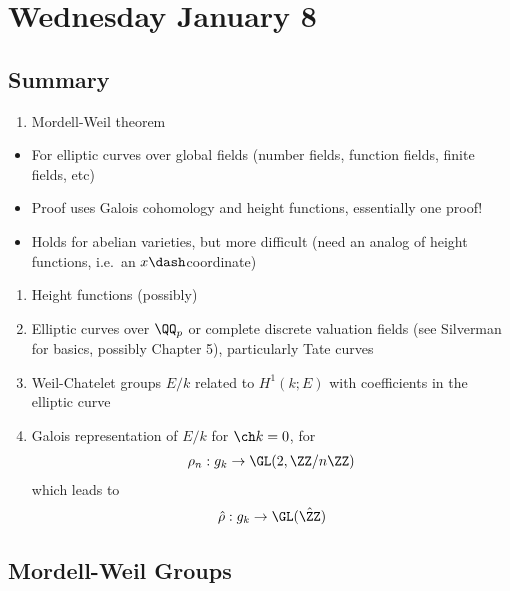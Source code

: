 \newpage
\tableofcontents

\hypertarget{wednesday-january-8}{%
\section{Wednesday January 8}\label{wednesday-january-8}}

\hypertarget{summary}{%
\subsection{Summary}\label{summary}}

\begin{enumerate}
\def\labelenumi{\arabic{enumi}.}
\tightlist
\item
  Mordell-Weil theorem
\end{enumerate}

\begin{itemize}
\item
  For elliptic curves over global fields (number fields, function
  fields, finite fields, etc)
\item
  Proof uses Galois cohomology and height functions, essentially one
  proof!
\item
  Holds for abelian varieties, but more difficult (need an analog of
  height functions, i.e.~an \(x\dash\)coordinate)
\end{itemize}

\begin{enumerate}
\def\labelenumi{\arabic{enumi}.}
\setcounter{enumi}{1}
\item
  Height functions (possibly)
\item
  Elliptic curves over \(\QQ_p\) or complete discrete valuation fields
  (see Silverman for basics, possibly Chapter 5), particularly Tate
  curves
\item
  Weil-Chatelet groups \(E/k\) related to \(H^1(k; E)\) with
  coefficients in the elliptic curve
\item
  Galois representation of \(E/k\) for \(\ch k = 0\), for
  \begin{align*}
    \rho_n: g_k \to \GL(2, \ZZ/n\ZZ)
    \end{align*} which leads to
  \begin{align*}
    \hat \rho: g_k \to \GL(\hat \ZZ)
    \end{align*}
\end{enumerate}

\hypertarget{mordell-weil-groups}{%
\subsection{Mordell-Weil Groups}\label{mordell-weil-groups}}

